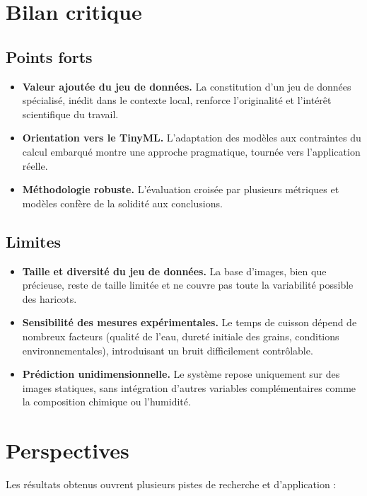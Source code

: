 \section{Bilan critique}
\label{sec:bilan_critique}

\subsection{Points forts}
\begin{itemize}
    \item \textbf{Valeur ajoutée du jeu de données.} La constitution d’un jeu de données spécialisé, inédit dans le contexte local, renforce l’originalité et l’intérêt scientifique du travail.
    \item \textbf{Orientation vers le TinyML.} L’adaptation des modèles aux contraintes du calcul embarqué montre une approche pragmatique, tournée vers l’application réelle.
    \item \textbf{Méthodologie robuste.} L’évaluation croisée par plusieurs métriques et modèles confère de la solidité aux conclusions.
\end{itemize}

\subsection{Limites}
\begin{itemize}
    \item \textbf{Taille et diversité du jeu de données.} La base d’images, bien que précieuse, reste de taille limitée et ne couvre pas toute la variabilité possible des haricots.
    \item \textbf{Sensibilité des mesures expérimentales.} Le temps de cuisson dépend de nombreux facteurs (qualité de l’eau, dureté initiale des grains, conditions environnementales), introduisant un bruit difficilement contrôlable. %
    \item \textbf{Prédiction unidimensionnelle.} Le système repose uniquement sur des images statiques, sans intégration d’autres variables complémentaires comme la composition chimique ou l’humidité.
\end{itemize}

\section{Perspectives}
\label{sec:perspectives}

Les résultats obtenus ouvrent plusieurs pistes de recherche et d’application :

